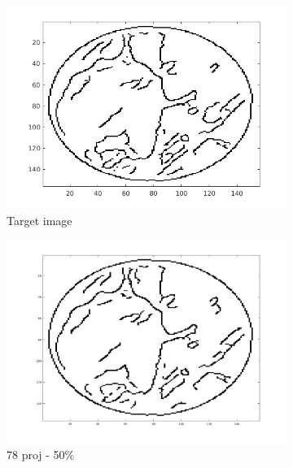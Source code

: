 \documentclass[10pt,a4paper,titlepage]{article}
\begin{document}
\begin{figure}[H]
        	
        	\begin{subfigure}[b]{0.32\textwidth}   
        	    \centering 
            	\includegraphics[width=\textwidth]{Sample1/Edges/target_auto.png}
            	\caption{Target image}  
        	\end{subfigure}
        	\begin{subfigure}[b]{0.32\textwidth}   
        	    \centering 
        	    \includegraphics[width=\textwidth]{Sample1/Edges/SB/p2_auto.png}
        	    \caption{78 proj - 50\%}  
        	    \label{subfig:78p1L-D}
       		\end{subfigure}
        	\begin{subfigure}[b]{0.32\textwidth}  

\end{subfigure}
\end{figure}
\end{document}
